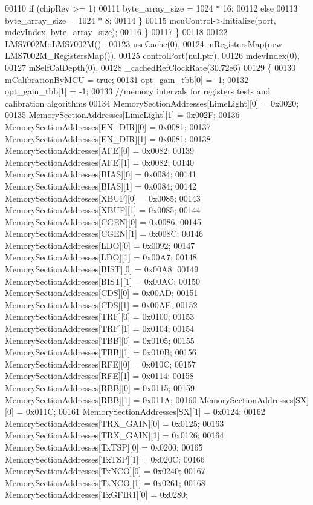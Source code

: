 \begin{DoxyCode}
00110             \textcolor{keywordflow}{if} (chipRev >= 1)
00111                 byte\_array\_size = 1024 * 16;
00112             \textcolor{keywordflow}{else}
00113                 byte\_array\_size = 1024 * 8;
00114         \}
00115         mcuControl->Initialize(port, mdevIndex, byte\_array\_size);
00116     \}
00117 \}
00118 
00122 LMS7002M::LMS7002M() :
00123     useCache(0),
00124     mRegistersMap(new LMS7002M_RegistersMap()),
00125     controlPort(nullptr),
00126     mdevIndex(0),
00127     mSelfCalDepth(0),
00128     \_cachedRefClockRate(30.72e6)
00129 \{
00130     mCalibrationByMCU = \textcolor{keyword}{true};
00131     opt_gain_tbb[0] = -1;
00132     opt_gain_tbb[1] = -1;
00133     \textcolor{comment}{//memory intervals for registers tests and calibration algorithms}
00134     MemorySectionAddresses[LimeLight][0] = 0x0020;
00135     MemorySectionAddresses[LimeLight][1] = 0x002F;
00136     MemorySectionAddresses[EN_DIR][0] = 0x0081;
00137     MemorySectionAddresses[EN_DIR][1] = 0x0081;
00138     MemorySectionAddresses[AFE][0] = 0x0082;
00139     MemorySectionAddresses[AFE][1] = 0x0082;
00140     MemorySectionAddresses[BIAS][0] = 0x0084;
00141     MemorySectionAddresses[BIAS][1] = 0x0084;
00142     MemorySectionAddresses[XBUF][0] = 0x0085;
00143     MemorySectionAddresses[XBUF][1] = 0x0085;
00144     MemorySectionAddresses[CGEN][0] = 0x0086;
00145     MemorySectionAddresses[CGEN][1] = 0x008C;
00146     MemorySectionAddresses[LDO][0] = 0x0092;
00147     MemorySectionAddresses[LDO][1] = 0x00A7;
00148     MemorySectionAddresses[BIST][0] = 0x00A8;
00149     MemorySectionAddresses[BIST][1] = 0x00AC;
00150     MemorySectionAddresses[CDS][0] = 0x00AD;
00151     MemorySectionAddresses[CDS][1] = 0x00AE;
00152     MemorySectionAddresses[TRF][0] = 0x0100;
00153     MemorySectionAddresses[TRF][1] = 0x0104;
00154     MemorySectionAddresses[TBB][0] = 0x0105;
00155     MemorySectionAddresses[TBB][1] = 0x010B;
00156     MemorySectionAddresses[RFE][0] = 0x010C;
00157     MemorySectionAddresses[RFE][1] = 0x0114;
00158     MemorySectionAddresses[RBB][0] = 0x0115;
00159     MemorySectionAddresses[RBB][1] = 0x011A;
00160     MemorySectionAddresses[SX][0] = 0x011C;
00161     MemorySectionAddresses[SX][1] = 0x0124;
00162     MemorySectionAddresses[TRX_GAIN][0] = 0x0125;
00163     MemorySectionAddresses[TRX_GAIN][1] = 0x0126;
00164     MemorySectionAddresses[TxTSP][0] = 0x0200;
00165     MemorySectionAddresses[TxTSP][1] = 0x020C;
00166     MemorySectionAddresses[TxNCO][0] = 0x0240;
00167     MemorySectionAddresses[TxNCO][1] = 0x0261;
00168     MemorySectionAddresses[TxGFIR1][0] = 0x0280;

\end{DoxyCode}
